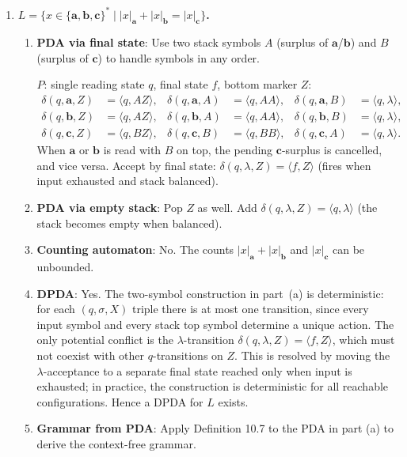 \begin{enumerate}[{10.}1. ]
\item \textbf{$L=\{x\in\{\pmb{a},\pmb{b},\pmb{c}\}^* \mid |x|_{\pmb{a}}+|x|_{\pmb{b}}=|x|_{\pmb{c}}\}$.}

\begin{enumerate}
\item \textbf{PDA via final state}: Use two stack symbols $A$ (surplus of $\pmb{a}$/$\pmb{b}$) and $B$ (surplus of $\pmb{c}$) to handle symbols in any order.

$P$: single reading state $q$, final state $f$, bottom marker $Z$:
\begin{align*}
\delta(q,\pmb{a},Z)&=\langle q,AZ\rangle, & \delta(q,\pmb{a},A)&=\langle q,AA\rangle, & \delta(q,\pmb{a},B)&=\langle q,\lambda\rangle,\\
\delta(q,\pmb{b},Z)&=\langle q,AZ\rangle, & \delta(q,\pmb{b},A)&=\langle q,AA\rangle, & \delta(q,\pmb{b},B)&=\langle q,\lambda\rangle,\\
\delta(q,\pmb{c},Z)&=\langle q,BZ\rangle, & \delta(q,\pmb{c},B)&=\langle q,BB\rangle, & \delta(q,\pmb{c},A)&=\langle q,\lambda\rangle.
\end{align*}
When $\pmb{a}$ or $\pmb{b}$ is read with $B$ on top, the pending $\pmb{c}$-surplus is cancelled, and vice versa.
Accept by final state: $\delta(q,\lambda,Z)=\langle f,Z\rangle$ (fires when input exhausted and stack balanced).

\item \textbf{PDA via empty stack}: Pop $Z$ as well. Add $\delta(q,\lambda,Z)=\langle q,\lambda\rangle$ (the stack becomes empty when balanced).

\item \textbf{Counting automaton}: No. The counts $|x|_{\pmb{a}}+|x|_{\pmb{b}}$ and $|x|_{\pmb{c}}$ can be unbounded.

\item \textbf{DPDA}: Yes. The two-symbol construction in part~(a) is deterministic: for each $(q, \sigma, X)$ triple there is at most one transition, since every input symbol and every stack top symbol determine a unique action. The only potential conflict is the $\lambda$-transition $\delta(q,\lambda,Z)=\langle f,Z\rangle$, which must not coexist with other $q$-transitions on $Z$. This is resolved by moving the $\lambda$-acceptance to a separate final state reached only when input is exhausted; in practice, the construction is deterministic for all reachable configurations. Hence a DPDA for $L$ exists.

\item \textbf{Grammar from PDA}: Apply Definition 10.7 to the PDA in part (a) to derive the context-free grammar.
\end{enumerate}


\end{enumerate}
